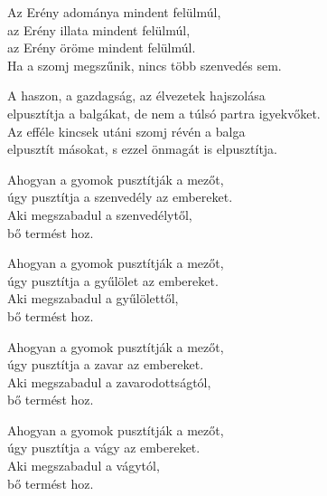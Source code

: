\begin{dhpverse}

 Az Erény adománya mindent felülmúl,\\
az Erény illata mindent felülmúl,\\
az Erény öröme mindent felülmúl.\\
Ha a szomj megszűnik, nincs több szenvedés sem.

 A haszon, a gazdagság, az élvezetek hajszolása\\
elpusztítja a balgákat, de nem a túlsó partra igyekvőket.\\
Az efféle kincsek utáni szomj révén a balga\\
elpusztít másokat, s ezzel önmagát is elpusztítja.

 Ahogyan a gyomok pusztítják a mezőt,\\
úgy pusztítja a szenvedély az embereket.\\
Aki megszabadul a szenvedélytől,\\
bő termést hoz.

 Ahogyan a gyomok pusztítják a mezőt,\\
úgy pusztítja a gyűlölet az embereket.\\
Aki megszabadul a gyűlölettől,\\
bő termést hoz.

 Ahogyan a gyomok pusztítják a mezőt,\\
úgy pusztítja a zavar az embereket.\\
Aki megszabadul a zavarodottságtól,\\
bő termést hoz.

 Ahogyan a gyomok pusztítják a mezőt,\\
úgy pusztítja a vágy az embereket.\\
Aki megszabadul a vágytól,\\
bő termést hoz.

\end{dhpverse}
